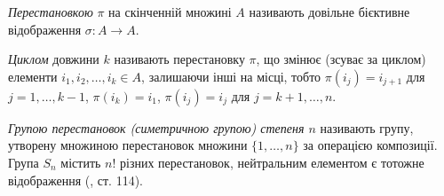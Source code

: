 \begin{definition}
    \emph{Перестановкою} $\pi$ на скінченній множині $A$
    називають довільне бієктивне відображення $\sigma: A \to A$.
\end{definition}
\begin{definition}
    \emph{Циклом} довжини $k$ називають перестановку $\pi$, що змінює
    (зсуває за циклом) елементи $i_1, i_2, \dots, i_k \in A$, залишаючи
    інші на місці, тобто $\pi(i_{j}) = i_{j+1}$ для $j=1,\dots,k-1$,
    $\pi(i_k) = i_1$, $\pi(i_j) = i_j$ для $j = k+1, \dots, n$. 
\end{definition}
\begin{definition}
    \emph{Групою перестановок (симетричною групою) степеня $n$}
    називають групу, утворену множиною перестановок
    множини $\{1, \dots, n\}$ за операцією композиції.
    Група $S_n$ містить $n!$ різних перестановок, нейтральним елементом є
    тотожне відображення (\cite{Spectorsky}, ст. 114).
\end{definition}